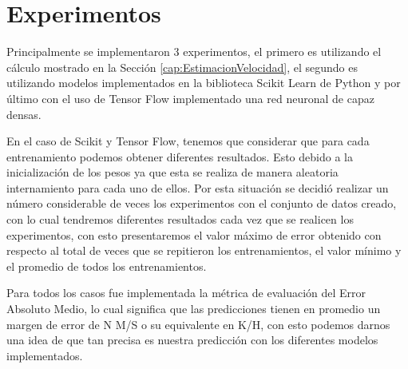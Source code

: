 \section{Experimentos}

Principalmente se implementaron 3 experimentos, el primero es utilizando el cálculo mostrado en la Sección \ref{cap:EstimacionVelocidad}, el segundo es utilizando modelos implementados en la biblioteca Scikit Learn de Python y por último con el uso de Tensor Flow implementado una red neuronal de capaz densas.

En el caso de Scikit y Tensor Flow, tenemos que considerar que para cada entrenamiento podemos obtener diferentes resultados. Esto debido a la inicialización de los pesos ya que esta se realiza de manera aleatoria internamiento para cada uno de ellos. Por esta situación se decidió realizar un número considerable de veces los experimentos con el conjunto de datos creado, con lo cual tendremos diferentes resultados cada vez que se realicen los experimentos, con esto presentaremos el valor máximo de error obtenido con respecto al total de veces que se repitieron los entrenamientos, el valor mínimo y el promedio de todos los entrenamientos.

Para todos los casos fue implementada la métrica de evaluación del Error Absoluto Medio, lo cual significa que las predicciones tienen en promedio un margen de error de N M/S o su equivalente en K/H, con esto podemos darnos una idea de que tan precisa es nuestra predicción con los diferentes modelos implementados.

